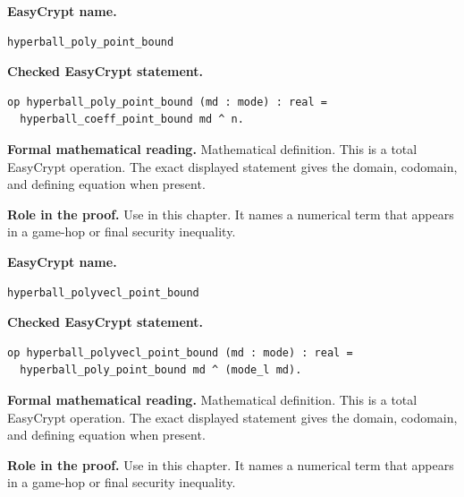 \begin{formaldefinition}
\noindent\textbf{EasyCrypt name.}
\begin{lstlisting}[language=EasyCrypt,basicstyle=\ttfamily\scriptsize]
hyperball_poly_point_bound
\end{lstlisting}
\noindent\textbf{Checked EasyCrypt statement.}
\begin{lstlisting}[language=EasyCrypt,basicstyle=\ttfamily\scriptsize]
op hyperball_poly_point_bound (md : mode) : real =
  hyperball_coeff_point_bound md ^ n.
\end{lstlisting}
\noindent\textbf{Formal mathematical reading.}
Mathematical definition. This is a total EasyCrypt operation.  The exact displayed statement gives the domain, codomain, and defining equation when present.

\noindent\textbf{Role in the proof.}
Use in this chapter. It names a numerical term that appears in a game-hop or final security inequality.

\end{formaldefinition}

\begin{formaldefinition}
\noindent\textbf{EasyCrypt name.}
\begin{lstlisting}[language=EasyCrypt,basicstyle=\ttfamily\scriptsize]
hyperball_polyvecl_point_bound
\end{lstlisting}
\noindent\textbf{Checked EasyCrypt statement.}
\begin{lstlisting}[language=EasyCrypt,basicstyle=\ttfamily\scriptsize]
op hyperball_polyvecl_point_bound (md : mode) : real =
  hyperball_poly_point_bound md ^ (mode_l md).
\end{lstlisting}
\noindent\textbf{Formal mathematical reading.}
Mathematical definition. This is a total EasyCrypt operation.  The exact displayed statement gives the domain, codomain, and defining equation when present.

\noindent\textbf{Role in the proof.}
Use in this chapter. It names a numerical term that appears in a game-hop or final security inequality.

\end{formaldefinition}

